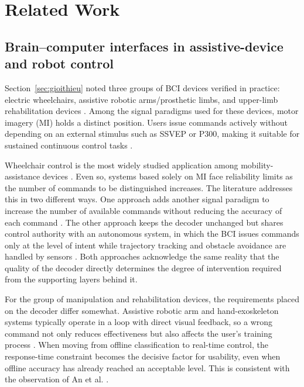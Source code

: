 \section{Related Work}
\label{sec:lienquan}

\subsection{Brain--computer interfaces in assistive-device and robot control}

Section~\ref{sec:gioithieu} noted three groups of BCI devices verified
in practice: electric wheelchairs, assistive robotic arms/prosthetic
limbs, and upper-limb rehabilitation devices \cite{varbu2022present}.
Among the signal paradigms used for these devices, motor imagery (MI)
holds a distinct position. Users issue commands actively without
depending on an external stimulus such as SSVEP or P300, making it
suitable for sustained continuous control tasks
\cite{palumbo2021motorimagery}.

Wheelchair control is the most widely studied application among
mobility-assistance devices \cite{palumbo2021motorimagery}. Even so,
systems based solely on MI face reliability limits as the number of
commands to be distinguished increases. The literature addresses this
in two different ways. One approach adds another signal paradigm to
increase the number of available commands without reducing the
accuracy of each command \cite{mai2024hybrid}. The other approach
keeps the decoder unchanged but shares control authority with an
autonomous system, in which the BCI issues commands only at the level
of intent while trajectory tracking and obstacle avoidance are
handled by sensors \cite{choi2023asynchronous}. Both approaches
acknowledge the same reality that the quality of the decoder directly
determines the degree of intervention required from the supporting
layers behind it.

For the group of manipulation and rehabilitation devices, the
requirements placed on the decoder differ somewhat. Assistive robotic
arm and hand-exoskeleton systems typically operate in a loop with
direct visual feedback, so a wrong command not only reduces
effectiveness but also affects the user's training process
\cite{casey2021bci, baniqued2021brain}. When moving from offline
classification to real-time control, the response-time constraint
becomes the decisive factor for usability, even when offline accuracy
has already reached an acceptable level. This is consistent with the
observation of An et al. \cite{an2024development}.

